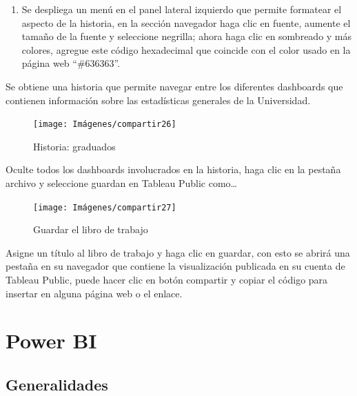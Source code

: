 \documentclass[
]{book}
\providecommand{\tightlist}{%
  \setlength{\itemsep}{0pt}\setlength{\parskip}{0pt}}
\begin{document}
\begin{enumerate}
\def\labelenumi{\arabic{enumi}.}
\setcounter{enumi}{6}
\tightlist
\item
  Se despliega un menú en el panel lateral izquierdo que permite formatear el aspecto de la historia, en la sección navegador haga clic en fuente, aumente el tamaño de la fuente y seleccione negrilla; ahora haga clic en sombreado y más colores, agregue este código hexadecimal que coincide con el color usado en la página web ``\#636363''.
\end{enumerate}

Se obtiene una historia que permite navegar entre los diferentes dashboards que contienen información sobre las estadísticas generales de la Universidad.

\begin{figure}

{\centering \texttt{[image: Imágenes/compartir26]} 

}

\caption{Historia: graduados}\label{fig:historiagraduados-fig}
\end{figure}

Oculte todos los dashboards involucrados en la historia, haga clic en la pestaña archivo y seleccione guardan en Tableau Public como\ldots{}

\begin{figure}

{\centering \texttt{[image: Imágenes/compartir27]} 

}

\caption{Guardar el libro de trabajo}\label{fig:guardarlibroddetrabajo-fig}
\end{figure}

Asigne un título al libro de trabajo y haga clic en guardar, con esto se abrirá una pestaña en su navegador que contiene la visualización publicada en su cuenta de Tableau Public, puede hacer clic en botón compartir y copiar el código para insertar en alguna página web o el enlace.

\hypertarget{powerbi}{%
\chapter{Power BI}\label{powerbi}}

\hypertarget{generalidadespowerbi}{%
\section{Generalidades}\label{generalidadespowerbi}}
\end{document}
